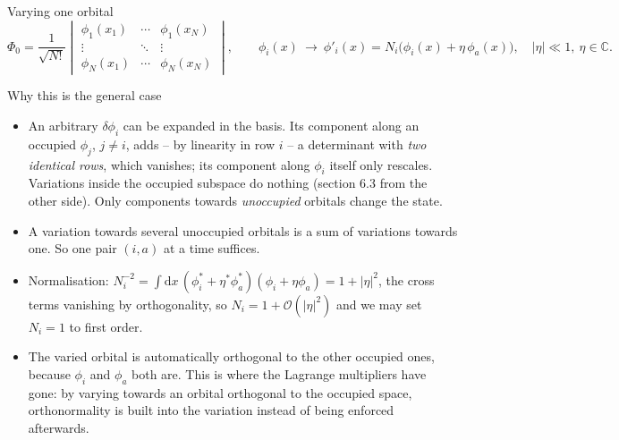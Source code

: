 \documentclass[aspectratio=169,10pt]{beamer}
\newcommand{\dd}{\mathrm{d}}
\newcommand{\bigO}{\mathcal{O}}
\begin{document}
\begin{frame}{Varying one orbital}
  \footnotesize
  \[
    \Phi_0=\frac{1}{\sqrt{N!}}
    \begin{vmatrix}
      \phi_1(x_1) & \cdots & \phi_1(x_N)\\
      \vdots & \ddots & \vdots\\
      \phi_N(x_1) & \cdots & \phi_N(x_N)
    \end{vmatrix},
    \qquad
    \phi_i(x)\ \longrightarrow\ \phi'_i(x)=N_i\bigl(\phi_i(x)+\eta\,\phi_a(x)\bigr),\quad|\eta|\ll1,\ \eta\in\mathbb{C}.
  \]
  \vspace{-0.6em}
  \begin{block}{Why this is the general case}
    \begin{itemize}
      \item An arbitrary $\delta\phi_i$ can be expanded in the basis. Its component along an occupied $\phi_j$, $j\ne i$, adds -- by linearity in row $i$ -- a determinant with \emph{two identical rows}, which vanishes; its component along $\phi_i$ itself only rescales. \alert{Variations inside the occupied subspace do nothing} (section 6.3 from the other side). Only components towards \emph{unoccupied} orbitals change the state.
      \item A variation towards several unoccupied orbitals is a sum of variations towards one. So one pair $(i,a)$ at a time suffices.
    \end{itemize}
  \end{block}
  \begin{itemize}
    \item Normalisation: $N_i^{-2}=\int\dd x\,(\phi_i^{*}+\eta^{*}\phi_a^{*})(\phi_i+\eta\phi_a)=1+|\eta|^2$, the cross terms vanishing by orthogonality, so $N_i=1+\bigO(|\eta|^2)$ and we may set $N_i=1$ to first order.
    \item The varied orbital is automatically orthogonal to the other occupied ones, because $\phi_i$ and $\phi_a$ both are. \alert{This is where the Lagrange multipliers have gone}: by varying towards an orbital orthogonal to the occupied space, orthonormality is built into the variation instead of being enforced afterwards.
  \end{itemize}
\end{frame}
\end{document}
